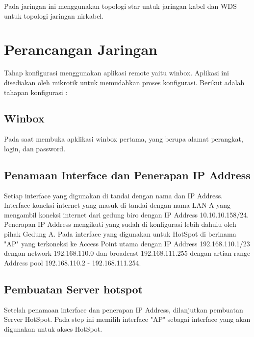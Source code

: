 \documentclass{jtetiproposalskripsi}
\begin{document}
Pada jaringan ini menggunakan topologi star untuk jaringan kabel dan WDS untuk topologi jaringan nirkabel.

\section{Perancangan Jaringan}
Tahap konfigurasi menggunakan aplikasi remote yaitu winbox. Aplikasi ini disediakan oleh mikrotik untuk memudahkan proses konfigurasi. Berikut adalah tahapan konfigurasi :
\subsection{Winbox}
Pada saat membuka apklikasi winbox pertama, yang berupa alamat perangkat, login, dan password.

\subsection{Penamaan Interface dan Penerapan IP Address}
Setiap interface yang digunakan di tandai dengan nama dan IP Address. Interface koneksi internet yang masuk di tandai dengan nama LAN-A yang mengambil koneksi internet dari gedung biro dengan IP Address 10.10.10.158/24. Penerapan IP Address mengikuti yang sudah di konfigurasi lebih dahulu oleh pihak Gedung A. Pada interface yang digunakan untuk HotSpot di berinama "AP" yang terkoneksi ke Access Point utama dengan IP Address 192.168.110.1/23 dengan network 192.168.110.0 dan broadcast 192.168.111.255 dengan artian range Address pool 192.168.110.2 - 192.168.111.254.

\subsection{Pembuatan Server hotspot}
Setelah penamaan interface dan penerapan IP Address, dilanjutkan pembuatan Server HotSpot. Pada step ini memilih interface "AP" sebagai interface yang akan digunakan untuk akses HotSpot. 
\end{document}
